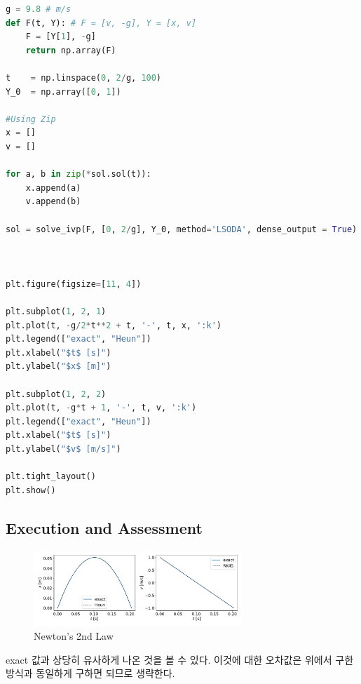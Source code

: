 \documentclass[11pt]{article}
\begin{document}
\begin{lstlisting}[language=Python]
g = 9.8 # m/s
def F(t, Y): # F = [v, -g], Y = [x, v]
    F = [Y[1], -g]
    return np.array(F)

t    = np.linspace(0, 2/g, 100)
Y_0  = np.array([0, 1])

#Using Zip
x = []
v = []

for a, b in zip(*sol.sol(t)):
    x.append(a)
    v.append(b)
    
sol = solve_ivp(F, [0, 2/g], Y_0, method='LSODA', dense_output = True)



plt.figure(figsize=[11, 4])

plt.subplot(1, 2, 1)
plt.plot(t, -g/2*t**2 + t, '-', t, x, ':k')
plt.legend(["exact", "Heun"])
plt.xlabel("$t$ [s]")
plt.ylabel("$x$ [m]")

plt.subplot(1, 2, 2)
plt.plot(t, -g*t + 1, '-', t, v, ':k')
plt.legend(["exact", "Heun"])
plt.xlabel("$t$ [s]")
plt.ylabel("$v$ [m/s]")

plt.tight_layout()
plt.show()
\end{lstlisting}






\subsection{Execution and Assessment}
\begin{figure}[!ht]
  \centering
  \includegraphics[width=0.7\textwidth]{newton.pdf}
  \caption{Newton's 2nd Law}
\end{figure}

exact 값과 상당히 유사하게 나온 것을 볼 수 있다. 이것에 대한 오차값은 위에서 구한 방식과 동일하게 구하면 되므로 생략한다.

\pagebreak
\end{document}
